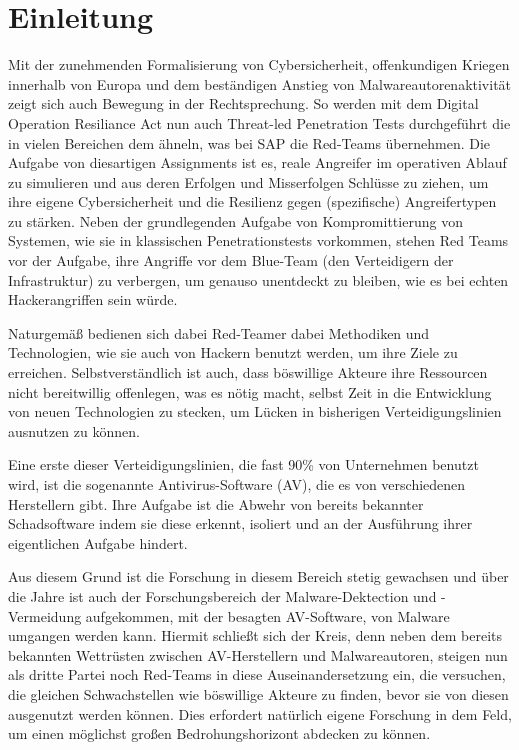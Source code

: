 \chapter{Einleitung}
Mit der zunehmenden Formalisierung von Cybersicherheit, offenkundigen Kriegen innerhalb von Europa und dem beständigen Anstieg von Malwareautorenaktivität zeigt sich auch Bewegung in der Rechtsprechung. So werden mit dem Digital Operation Resiliance Act  nun auch Threat-led Penetration Tests durchgeführt \cite{ab_2024_tlpt} die in vielen Bereichen dem ähneln, was bei SAP die Red-Teams übernehmen. Die Aufgabe von diesartigen Assignments ist es, reale Angreifer im operativen Ablauf zu simulieren und aus deren Erfolgen und Misserfolgen Schlüsse zu ziehen, um ihre eigene Cybersicherheit und die Resilienz gegen (spezifische) Angreifertypen zu stärken.
Neben der grundlegenden Aufgabe von Kompromittierung von Systemen, wie sie in klassischen Penetrationstests vorkommen, stehen Red Teams vor der Aufgabe, ihre Angriffe vor dem Blue-Team (den Verteidigern der Infrastruktur) zu verbergen, um genauso unentdeckt zu bleiben, wie es bei echten Hackerangriffen sein würde.

Naturgemäß bedienen sich dabei Red-Teamer dabei Methodiken und Technologien, wie sie auch von Hackern benutzt werden, um ihre Ziele zu erreichen. Selbstverständlich ist auch, dass böswillige Akteure ihre Ressourcen nicht bereitwillig offenlegen, was es nötig macht, selbst Zeit in die Entwicklung von neuen Technologien zu stecken, um Lücken in bisherigen Verteidigungslinien ausnutzen zu können.

 Eine erste dieser Verteidigungslinien, die fast 90\% \cite{dey_2024_antivirus} von Unternehmen benutzt wird, ist die sogenannte Antivirus-Software (AV), die es von verschiedenen Herstellern gibt. Ihre Aufgabe ist die Abwehr von bereits bekannter Schadsoftware indem sie diese erkennt, isoliert und an der Ausführung ihrer eigentlichen Aufgabe hindert.

Aus diesem Grund ist die Forschung in diesem Bereich stetig gewachsen und über die Jahre ist auch der Forschungsbereich der Malware-Dektection und -Vermeidung aufgekommen, mit der besagten AV-Software, von Malware umgangen werden kann. Hiermit schließt sich der Kreis, denn neben dem bereits bekannten Wettrüsten zwischen AV-Herstellern und Malwareautoren, steigen nun als dritte Partei noch Red-Teams in diese Auseinandersetzung ein, die versuchen, die gleichen Schwachstellen wie böswillige Akteure zu finden, bevor sie von diesen ausgenutzt werden können. Dies erfordert natürlich eigene Forschung in dem Feld, um einen möglichst großen Bedrohungshorizont abdecken zu können.

